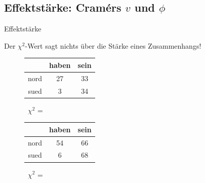 \subsection[Effektstärke]{Effektstärke: Cramérs $v$ und $\phi$}

\begin{frame}{Effektstärke}

  Der $\chi^2$-Wert sagt nichts über die \alert{Stärke eines Zusammenhangs}!\\

  \begin{figure}[h]
    \centering
    \begin{tabular}{|c|c|c|}
      \hline
      &  haben & sein\\
      \hline
      nord   &  27      & 33 \\
      \hline
	sued   &   3      & 34 \\
      \hline
    \end{tabular}~$\chi^2$ = ~
  \end{figure}

  \begin{figure}[h]
    \centering
    \begin{tabular}{|c|c|c|}
      \hline
	    &  haben & sein\\
      \hline
	nord   &  54      & 66 \\
      \hline
	sued   &  6     & 68 \\
      \hline
      \end{tabular}~$\chi^2$ = ~
  \end{figure}
\end{frame}


